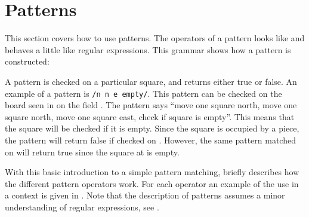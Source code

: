 \section{Patterns}
\label{sec:patterns}

This section covers how to use patterns. The operators of a pattern looks 
like and behaves a little like regular expressions. This
grammar shows how a pattern is constructed:

\begin{ebnf}
\end{ebnf}


A pattern is checked on a particular square, and returns either true or false.
An example of a pattern is \texttt{/n n e empty/}. This pattern can be checked on
the board seen in  on the field . The pattern
says ``move one square north, move one square north, move one square east, check if
square is empty''. This means that the square  will be checked if it
is empty. Since the square is occupied by a piece, the pattern will return
false if checked on . However, the same pattern matched on
 will return true since the square at  is empty.


With this basic introduction to a simple pattern matching,
 briefly describes how the different pattern
operators work. For each operator an example of the use in a context is given
in . Note that the description of patterns assumes a
minor understanding of regular expressions, see \cite{regex}\cite{perlRegex}.

